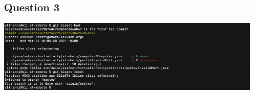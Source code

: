 \subsection*{Question 3}
\begin{center}
    \includegraphics[width=1\textwidth]{img/partF_foundCommit.png}
\end{center}
